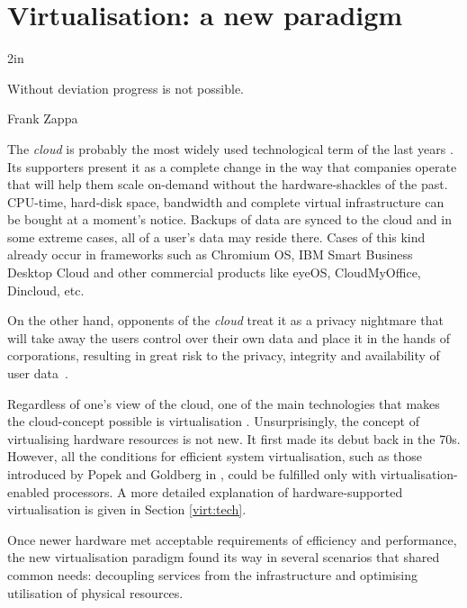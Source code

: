 \chapter{Virtualisation: a new paradigm}\label{virt:paradigm}

\epigraph{2in}{Without deviation progress is not possible.}{Frank Zappa}{}

The \emph{cloud} is probably the most widely used technological term of the last years \cite{Buyya:2011:CCP:1971955}. 
Its supporters present it as a complete change in the way that companies operate that will help them scale on-demand without the hardware-shackles of the past. 
CPU-time, hard-disk space, bandwidth and complete virtual infrastructure can be bought at a moment's notice. 
Backups of data are synced to the cloud and in some extreme cases, all of a user's data may reside there.
Cases of this kind already occur in frameworks such as Chromium OS, IBM Smart Business Desktop Cloud and other commercial products like eyeOS, CloudMyOffice, Dincloud, etc. 

On the other hand, opponents of the \emph{cloud} treat it as a privacy nightmare that will take away the users control over their own data and place it in the hands of corporations, resulting in great risk to the privacy, integrity and availability of user data~\cite{amazon_cloud_problem, exposingFHS2011}. %

Regardless of one's view of the cloud, one of the main technologies that makes the cloud-concept possible is virtualisation \cite{Gurav:2010:VKF:1741906.1741957}. Unsurprisingly, the concept of virtualising hardware resources is not new. It first made its debut back in the 70s. However, all the conditions for efficient system virtualisation, such as those introduced by Popek and Goldberg in \cite{popekgoldberg}, could be fulfilled only with virtualisation-enabled processors. A more detailed explanation of hardware-supported virtualisation is given in Section \ref{virt:tech}.%


Once newer hardware met acceptable requirements of efficiency and performance, the new virtualisation paradigm found its way in several scenarios that shared common needs: decoupling services from the infrastructure and optimising utilisation of physical resources.%
 
